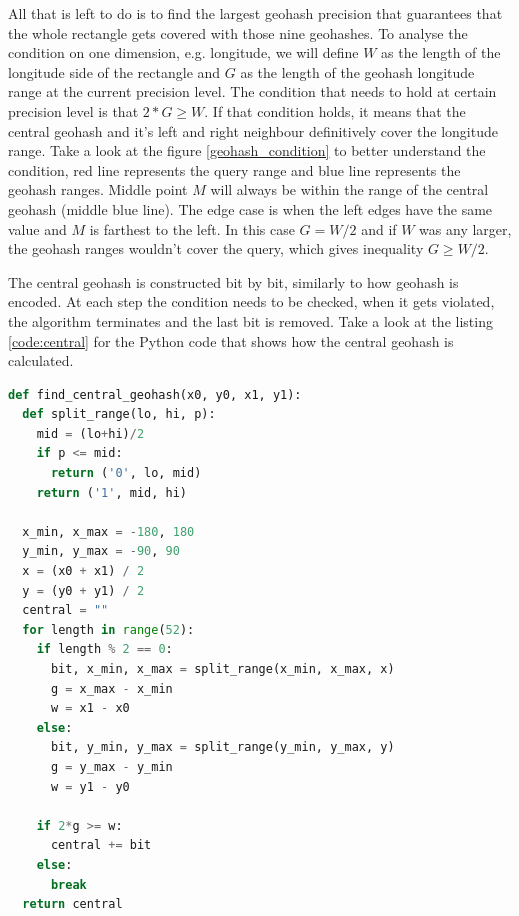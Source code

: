 \documentclass[times, utf8, diplomski]{fer}
\begin{document}
All that is left to do is to find the largest geohash precision that guarantees that the whole rectangle gets covered with those nine geohashes. To analyse the condition on one dimension, e.g. longitude, we will define $W$ as the length of the longitude side of the rectangle and $G$ as the length of the geohash longitude range at the current precision level. The condition that needs to hold at certain precision level is that $2*G \ge W$. If that condition holds, it means that the central geohash and it's left and right neighbour definitively cover the longitude range. Take a look at the figure \ref{geohash_condition} to better understand the condition, red line represents the query range and blue line represents the geohash ranges. Middle point $M$ will always be within the range of the central geohash (middle blue line). The edge case is when the left edges have the same value and $M$ is farthest to the left. In this case $G=W/2$ and if $W$ was any larger, the geohash ranges wouldn't cover the query, which gives inequality $G \ge W/2$.

The central geohash is constructed bit by bit, similarly to how geohash is encoded. At each step the condition needs to be checked, when it gets violated, the algorithm terminates and the last bit is removed. Take a look at the listing \ref{code:central} for the Python code that shows how the central geohash is calculated.

\label{code:central}
\begin{lstlisting}[language=Python, caption=Finding central geohash]
def find_central_geohash(x0, y0, x1, y1):
  def split_range(lo, hi, p):
    mid = (lo+hi)/2
    if p <= mid:
      return ('0', lo, mid)
    return ('1', mid, hi)

  x_min, x_max = -180, 180
  y_min, y_max = -90, 90
  x = (x0 + x1) / 2
  y = (y0 + y1) / 2
  central = ""
  for length in range(52):
    if length % 2 == 0:
      bit, x_min, x_max = split_range(x_min, x_max, x)
      g = x_max - x_min
      w = x1 - x0
    else:
      bit, y_min, y_max = split_range(y_min, y_max, y)
      g = y_max - y_min
      w = y1 - y0

    if 2*g >= w:
      central += bit
    else:
      break
  return central
\end{lstlisting}
\end{document}
